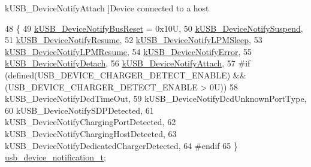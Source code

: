\begin{Desc}
\begin{description}
{\hypertarget{group__usb__device__controller__driver_ggafdba1a6b57efd437d6a941bfbb9239dba9b4873734c36adcc45b205b5f55bad31}{k\-U\-S\-B\-\_\-\-Device\-Notify\-Attach}\label{group__usb__device__controller__driver_ggafdba1a6b57efd437d6a941bfbb9239dba9b4873734c36adcc45b205b5f55bad31}
}]Device connected to a host \end{description}
\end{Desc}

\begin{DoxyCode}
48 \{
49     \hyperlink{group__usb__device__controller__driver_ggafdba1a6b57efd437d6a941bfbb9239dba6b3844cfeb2f1acd91ec86e553cb4938}{kUSB\_DeviceNotifyBusReset} = 0x10U, 
50     \hyperlink{group__usb__device__controller__driver_ggafdba1a6b57efd437d6a941bfbb9239dbaa9a1526acc96165a26fe187a771bd7ca}{kUSB\_DeviceNotifySuspend},          
51     \hyperlink{group__usb__device__controller__driver_ggafdba1a6b57efd437d6a941bfbb9239dbaf82ebeb85b3be0b518d0608052acfb46}{kUSB\_DeviceNotifyResume},           
52     \hyperlink{group__usb__device__controller__driver_ggafdba1a6b57efd437d6a941bfbb9239dba28a2f5e3abf7a469f1f39f154b8e72b9}{kUSB\_DeviceNotifyLPMSleep},         
53     \hyperlink{group__usb__device__controller__driver_ggafdba1a6b57efd437d6a941bfbb9239dba35a2f56b459ad548456cc002b468a632}{kUSB\_DeviceNotifyLPMResume},        
54     \hyperlink{group__usb__device__controller__driver_ggafdba1a6b57efd437d6a941bfbb9239dba703fdebcf80a09a04f9149cc9171576f}{kUSB\_DeviceNotifyError},            
55     \hyperlink{group__usb__device__controller__driver_ggafdba1a6b57efd437d6a941bfbb9239dba26b9d31e47d99f112ebc74b17e1879cd}{kUSB\_DeviceNotifyDetach},           
56     \hyperlink{group__usb__device__controller__driver_ggafdba1a6b57efd437d6a941bfbb9239dba9b4873734c36adcc45b205b5f55bad31}{kUSB\_DeviceNotifyAttach},           
57 \textcolor{preprocessor}{#if (defined(USB\_DEVICE\_CHARGER\_DETECT\_ENABLE) && (USB\_DEVICE\_CHARGER\_DETECT\_ENABLE > 0U))
}
58 \textcolor{preprocessor}{}    kUSB\_DeviceNotifyDcdTimeOut,               
59     kUSB\_DeviceNotifyDcdUnknownPortType,       
60     kUSB\_DeviceNotifySDPDetected,              
61     kUSB\_DeviceNotifyChargingPortDetected,     
62     kUSB\_DeviceNotifyChargingHostDetected,     
63     kUSB\_DeviceNotifyDedicatedChargerDetected, 
64 \textcolor{preprocessor}{#endif
}
65 \textcolor{preprocessor}{}\} \hyperlink{group__usb__device__controller__driver_gabb134b8f1a6b63ae3979523ba53480bc}{usb\_device\_notification\_t};
\end{DoxyCode}
